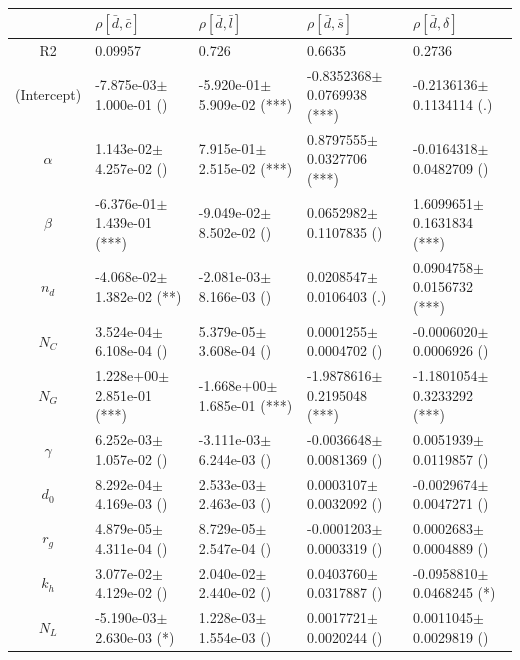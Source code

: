 \begin{center}
\begin{tabular}{|c|p{3.7cm}|p{3.7cm}|p{3.7cm}|p{3.7cm}|}
 \hline
&$\rho[\bar{d},\bar{c}]$&$\rho[\bar{d},\bar{l}]$&$\rho[\bar{d},\bar{s}]$&$\rho[\bar{d},\delta]$\\\hline
R2&0.09957&0.726&0.6635&0.2736\\\hline
(Intercept)&-7.875e-03$\pm$1.000e-01 ()&-5.920e-01$\pm$5.909e-02 (***)&-0.8352368$\pm$0.0769938 (***)&-0.2136136$\pm$0.1134114 (.)\\
$\alpha$&1.143e-02$\pm$4.257e-02 ()&7.915e-01$\pm$2.515e-02 (***)&0.8797555$\pm$0.0327706 (***)&-0.0164318$\pm$0.0482709 ()\\
$\beta$&-6.376e-01$\pm$1.439e-01 (***)&-9.049e-02$\pm$8.502e-02 ()&0.0652982$\pm$0.1107835 ()&1.6099651$\pm$0.1631834 (***)\\
$n_d$&-4.068e-02$\pm$1.382e-02 (**)&-2.081e-03$\pm$8.166e-03 ()&0.0208547$\pm$0.0106403 (.)&0.0904758$\pm$0.0156732 (***)\\
$N_C$&3.524e-04$\pm$6.108e-04 ()&5.379e-05$\pm$3.608e-04 ()&0.0001255$\pm$0.0004702 ()&-0.0006020$\pm$0.0006926 ()\\
$N_G$&1.228e+00$\pm$2.851e-01 (***)&-1.668e+00$\pm$1.685e-01 (***)&-1.9878616$\pm$0.2195048 (***)&-1.1801054$\pm$0.3233292 (***)\\
$\gamma$&6.252e-03$\pm$1.057e-02 ()&-3.111e-03$\pm$6.244e-03 ()&-0.0036648$\pm$0.0081369 ()&0.0051939$\pm$0.0119857 ()\\
$d_0$&8.292e-04$\pm$4.169e-03 ()&2.533e-03$\pm$2.463e-03 ()&0.0003107$\pm$0.0032092 ()&-0.0029674$\pm$0.0047271 ()\\
$r_g$&4.879e-05$\pm$4.311e-04 ()&8.729e-05$\pm$2.547e-04 ()&-0.0001203$\pm$0.0003319 ()&0.0002683$\pm$0.0004889 ()\\
$k_h$&3.077e-02$\pm$4.129e-02 ()&2.040e-02$\pm$2.440e-02 ()&0.0403760$\pm$0.0317887 ()&-0.0958810$\pm$0.0468245 (*)\\
$N_L$&-5.190e-03$\pm$2.630e-03 (*)&1.228e-03$\pm$1.554e-03 ()&0.0017721$\pm$0.0020244 ()&0.0011045$\pm$0.0029819 ()\\
\hline
\end{tabular}

\bigskip


\end{center}
